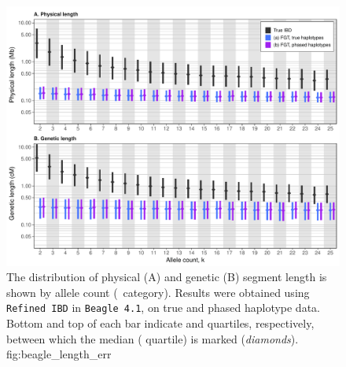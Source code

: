 

\begin{figure}[!htb]
\includegraphics[width=\textwidth]{./img/ch4/beagle_length_err}
{The distribution of physical (A) and genetic (B) segment length is shown by allele count (\fk{}~category).
Results were obtained using \texttt{Refined\,IBD} in \texttt{Beagle\,4.1}, on true and phased haplotype data.
Bottom and top of each bar indicate  and  quartiles, respectively, between which the median ( quartile) is marked (\emph{diamonds}).}
{fig:beagle_length_err}
\end{figure}
